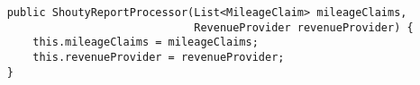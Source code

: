 \begin{verbatim}
    public ShoutyReportProcessor(List<MileageClaim> mileageClaims, 
                                 RevenueProvider revenueProvider) {
        this.mileageClaims = mileageClaims;
        this.revenueProvider = revenueProvider;
    }
\end{verbatim}